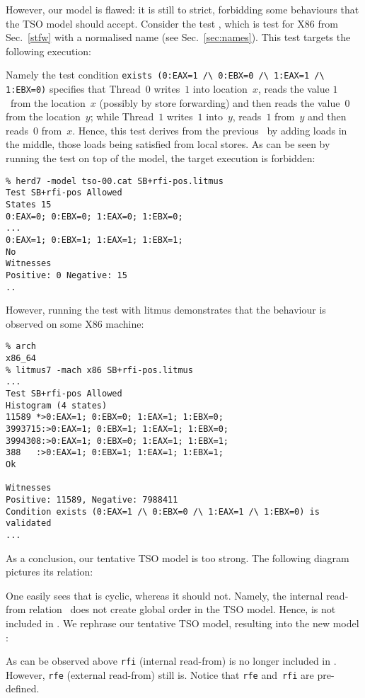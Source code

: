 However,
our model  is flawed: it is still to strict,
forbidding some behaviours that the TSO model should accept.
Consider the test ,
which is test  for X86 from Sec.~\ref{stfw} with a normalised name (see Sec.~\ref{sec:names}).
This test targets the following execution:
\begin{center}\end{center}
Namely the test condition
\verb+exists (0:EAX=1 /\ 0:EBX=0 /\ 1:EAX=1 /\ 1:EBX=0)+
specifies that Thread~$0$ writes~$1$ into location~$x$,
reads the value $1$~from the location~$x$ (possibly by store forwarding) and
then reads the value~$0$ from the location~$y$;
while Thread~$1$ writes~$1$ into~$y$,
reads~$1$ from~$y$ and then reads~$0$ from~$x$.
Hence, this test derives from the previous~
by adding loads in the middle, those loads
being  satisfied from local stores.
As can be seen by running the test on top of the 
model, the target execution is forbidden:
\begin{verbatim}
% herd7 -model tso-00.cat SB+rfi-pos.litmus
Test SB+rfi-pos Allowed
States 15
0:EAX=0; 0:EBX=0; 1:EAX=0; 1:EBX=0;
...
0:EAX=1; 0:EBX=1; 1:EAX=1; 1:EBX=1;
No
Witnesses
Positive: 0 Negative: 15
..
\end{verbatim}
However, running the test with litmus demonstrates that the behaviour
is observed on some X86 machine:
\begin{verbatim}
% arch
x86_64
% litmus7 -mach x86 SB+rfi-pos.litmus
...
Test SB+rfi-pos Allowed
Histogram (4 states)
11589 *>0:EAX=1; 0:EBX=0; 1:EAX=1; 1:EBX=0;
3993715:>0:EAX=1; 0:EBX=1; 1:EAX=1; 1:EBX=0;
3994308:>0:EAX=1; 0:EBX=0; 1:EAX=1; 1:EBX=1;
388   :>0:EAX=1; 0:EBX=1; 1:EAX=1; 1:EBX=1;
Ok

Witnesses
Positive: 11589, Negative: 7988411
Condition exists (0:EAX=1 /\ 0:EBX=0 /\ 1:EAX=1 /\ 1:EBX=0) is validated
...
\end{verbatim}
As a conclusion, our tentative TSO model is too strong.
The following diagram pictures its  relation:
\begin{center}\end{center}
One easily sees that  is cyclic, whereas it should not.
Namely, the internal read-from relation~ does
not create global order in the TSO model.
Hence,  is not included in .
We rephrase our tentative TSO model, resulting into the new model
:

As can be observed above \texttt{rfi} (internal read-from) is no longer
included in . However, \texttt{rfe} (external read-from)
still is. Notice that \texttt{rfe} and~\texttt{rfi} are pre-defined.


